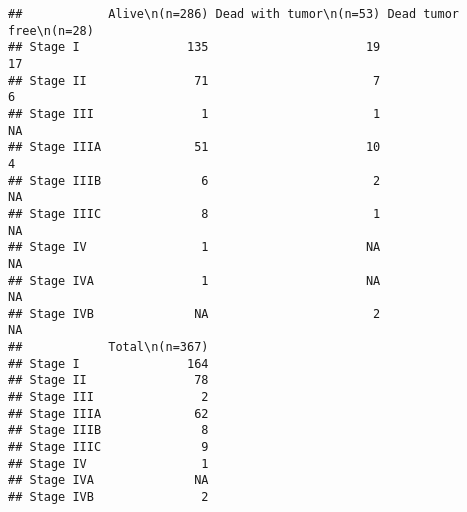 \documentclass[]{article}
\newenvironment{Shaded}{\begin{snugshade}}{\end{snugshade}}
\newcommand{\KeywordTok}[1]{\textcolor[rgb]{0.13,0.29,0.53}{\textbf{#1}}}
\newcommand{\DecValTok}[1]{\textcolor[rgb]{0.00,0.00,0.81}{#1}}
\newcommand{\CharTok}[1]{\textcolor[rgb]{0.31,0.60,0.02}{#1}}
\newcommand{\StringTok}[1]{\textcolor[rgb]{0.31,0.60,0.02}{#1}}
\newcommand{\CommentTok}[1]{\textcolor[rgb]{0.56,0.35,0.01}{\textit{#1}}}
\newcommand{\ControlFlowTok}[1]{\textcolor[rgb]{0.13,0.29,0.53}{\textbf{#1}}}
\newcommand{\OperatorTok}[1]{\textcolor[rgb]{0.81,0.36,0.00}{\textbf{#1}}}
\newcommand{\NormalTok}[1]{#1}
\begin{document}
\begin{verbatim}
##            Alive\n(n=286) Dead with tumor\n(n=53) Dead tumor free\n(n=28)
## Stage I               135                      19                      17
## Stage II               71                       7                       6
## Stage III               1                       1                      NA
## Stage IIIA             51                      10                       4
## Stage IIIB              6                       2                      NA
## Stage IIIC              8                       1                      NA
## Stage IV                1                      NA                      NA
## Stage IVA               1                      NA                      NA
## Stage IVB              NA                       2                      NA
##            Total\n(n=367)
## Stage I               164
## Stage II               78
## Stage III               2
## Stage IIIA             62
## Stage IIIB              8
## Stage IIIC              9
## Stage IV                1
## Stage IVA              NA
## Stage IVB               2
\end{verbatim}

\begin{Shaded}
\end{Shaded}
\end{document}
